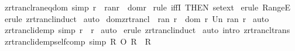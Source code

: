 \begin{isabellebody}
\ zrtrancl{\isacharunderscore}ran{\isacharunderscore}eq{\isacharunderscore}dom\ {\isacharbrackleft}simp{\isacharbrackright}{\isacharcolon}\ {\isachardoublequoteopen}{\isacharbang}{\isacharbang}r\ {\isachardot}\ ran{\isacharparenleft}r{\isacharpercent}{\isacharasterisk}{\isacharparenright}\ {\isacharequal}\ dom{\isacharparenleft}r{\isacharpercent}{\isacharasterisk}{\isacharparenright}{\isachardoublequoteclose}\isanewline
%
\isadelimproof
%
\endisadelimproof
%
\isatagproof
{}\isamarkupfalse%
\ {\isacharparenleft}rule\ iffI\ {\isacharbrackleft}THEN\ set{\isacharunderscore}ext{\isacharbrackright}{\isacharparenright}\isanewline
{}\isamarkupfalse%
\ {\isacharparenleft}erule\ RangeE{\isacharparenright}\isanewline
{}\isamarkupfalse%
\ {\isacharparenleft}erule\ zrtrancl{\isacharunderscore}induct{\isacharparenright}\isanewline
{}\isamarkupfalse%
\ auto\isanewline
{}\isamarkupfalse%
%
\endisatagproof
{\isafoldproof}%
%
\isadelimproof
\isanewline
%
\endisadelimproof
\isanewline
{}\isamarkupfalse%
\ dom{\isacharunderscore}zrtrancl\ {\isacharcolon}\ {\isachardoublequoteopen}ran\ {\isacharparenleft}r{\isacharpercent}{\isacharasterisk}{\isacharparenright}\ {\isacharequal}\ {\isacharparenleft}dom\ r\ Un\ ran\ r{\isacharparenright}{\isachardoublequoteclose}\isanewline
%
\isadelimproof
%
\endisadelimproof
%
\isatagproof
{}\isamarkupfalse%
\ auto\isanewline
{}\isamarkupfalse%
%
\endisatagproof
{\isafoldproof}%
%
\isadelimproof
\isanewline
%
\endisadelimproof
\isanewline
\isanewline
{}\isamarkupfalse%
\ zrtrancl{\isacharunderscore}idemp\ {\isacharbrackleft}simp{\isacharbrackright}{\isacharcolon}\ {\isachardoublequoteopen}{\isacharparenleft}r{\isacharpercent}{\isacharasterisk}{\isacharparenright}{\isacharpercent}{\isacharasterisk}\ {\isacharequal}\ r{\isacharpercent}{\isacharasterisk}{\isachardoublequoteclose}\isanewline
%
\isadelimproof
%
\endisadelimproof
%
\isatagproof
{}\isamarkupfalse%
\ auto\isanewline
{}\isamarkupfalse%
\ {\isacharparenleft}erule\ zrtrancl{\isacharunderscore}induct{\isacharparenright}\isanewline
{}\isamarkupfalse%
\ {\isacharparenleft}auto\ intro{\isacharcolon}\ zrtrancl{\isacharunderscore}trans{\isacharparenright}\isanewline
{}\isamarkupfalse%
%
\endisatagproof
{\isafoldproof}%
%
\isadelimproof
\isanewline
%
\endisadelimproof
\isanewline
{}\isamarkupfalse%
\ zrtrancl{\isacharunderscore}idemp{\isacharunderscore}self{\isacharunderscore}comp\ {\isacharbrackleft}simp{\isacharbrackright}{\isacharcolon}\ {\isachardoublequoteopen}R{\isacharpercent}{\isacharasterisk}\ O\ R{\isacharpercent}{\isacharasterisk}\ {\isacharequal}\ R{\isacharpercent}{\isacharasterisk}{\isachardoublequoteclose}\isanewline

\end{isabellebody}
